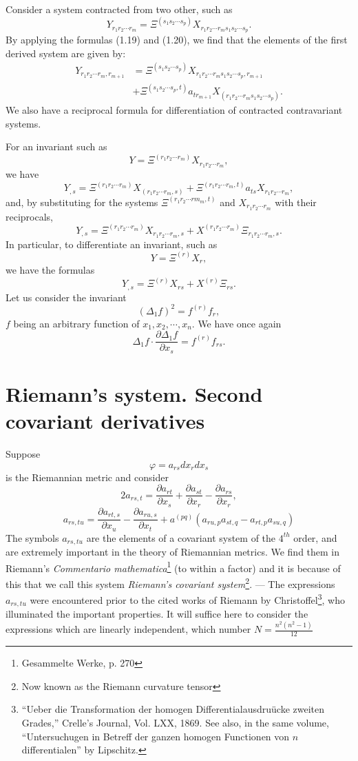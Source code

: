 \documentclass{book}
\begin{document}
Consider a system contracted from two other, such as
$$Y_{r_1r_2\cdots r_m}=\Xi^{(s_1s_2\cdots s_p)}X_{r_1r_2\cdots r_ms_1s_2\cdots s_p}.$$
By applying the formulas (1.19) and (1.20), we find that the elements of the first derived system are given by:
\begin{align}
Y_{r_1r_2\cdots r_m,r_{m+1}}&=\Xi^{(s_1s_2\cdots s_p)}X_{r_1r_2\cdots r_ms_1s_2\cdots s_p,r_{m+1}}\nonumber
\\&+\Xi^{(s_1s_2\cdots s_p,t)}a_{tr_{m+1}}X_{(r_1r_2\cdots r_ms_1s_2\cdots s_p)}.
\end{align}
We also have a reciprocal formula for differentiation of contracted contravariant systems. 

For an invariant such as
$$Y=\Xi^{(r_1r_2\cdots r_m)}X_{r_1r_2\cdots r_m},$$
we have
$$Y_{,s}=\Xi^{(r_1r_2\cdots r_m)}X_{(r_1r_2\cdots r_m,s)}+\Xi^{(r_1r_2\cdots r_m,t)}a_{ts}X_{r_1r_2\cdots r_m},$$
and, by substituting for the systems $\Xi^{(r_1r_2\cdots rm_m,t)}$ and $X_{r_1r_2\cdots r_m}$ with their reciprocals,
\begin{equation}
Y_{,s}=\Xi^{(r_1r_2\cdots r_m)}X_{r_1r_2\cdots r_m,s}+X^{(r_1r_2\cdots r_m)}\Xi_{r_1r_2\cdots r_m,s}.
\end{equation}
In particular, to differentiate an invariant, such as
$$Y=\Xi^{(r)}X_r,$$
we have the formulas
\begin{equation*}
\tag{1.22'}
Y_{,s}=\Xi^{(r)}X_{rs}+X^{(r)}\Xi_{rs}.
\end{equation*}
Let us consider the invariant
$$(\Delta_1f)^2=f^{(r)}f_r,$$
$f$ being an arbitrary function of $x_1,x_2,\cdots,x_n$. We have once again
$$\Delta_1f\cdot\frac{\partial\Delta_1f}{\partial x_s}=f^{(r)}f_{rs}.$$
\section{Riemann's system. Second covariant derivatives}
Suppose
$$\varphi=a_{rs}dx_rdx_s$$
is the Riemannian metric and consider
$$2a_{rs,t}=\frac{\partial a_{rt}}{\partial x_s}+\frac{\partial a_{st}}{\partial x_r}-\frac{\partial a_{rs}}{\partial x_r},$$
$$a_{rs,tu}=\frac{\partial a_{rt,s}}{\partial x_u}-\frac{\partial a_{ru,s}}{\partial x_t}+a^{(pq)}(a_{ru,p}a_{st,q}-a_{rt,p}a_{su,q})$$
The symbols $a_{rs,tu}$ are the elements of a covariant system of the $4^{th}$ order, and are extremely important in the theory of Riemannian metrics. We find them in Riemann's \emph{Commentario mathematica}\footnote{Gesammelte Werke, p. 270} (to within a factor) and it is because of this that we call this system \emph{Riemann's covariant system}\footnote{Now known as the Riemann curvature tensor}. --- The expressions $a_{rs,tu}$ were encountered prior to the cited works of Riemann by Christoffel\footnote{``Ueber die Transformation der homogen Differentialausdru\"ucke zweiten Grades,'' Crelle's Journal, Vol. LXX, 1869. See also, in the same volume, ``Untersuchugen in Betreff der ganzen homogen Functionen von $n$ differentialen'' by Lipschitz.}, who illuminated the important properties. It will suffice here to consider the expressions which are linearly independent, which number $N=\frac{n^2(n^2-1)}{12}$
\end{document}

